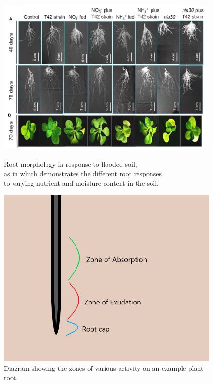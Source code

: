 \documentclass[11pt]{article}
\begin{document}

\begin{figure}
\centering
\begin{minipage}{.5\textwidth}
    \centering
    \includegraphics[width=\linewidth,trim= 10 70 10 0,clip]{rootMorphology.jpg}
    \caption{Root morphology in response to flooded soil, \\ as in \cite{PURNOBASUKI20182012} which demonstrates the different root responses\\ to varying nutrient and moisture content in the soil.}
    \label{fig:roots}
\end{minipage}%
\begin{minipage}{.5\textwidth}
  \centering
    \includegraphics[width=.5\linewidth,trim=50 20 100 20,clip]{Zonesdiagram.png}
    \caption{Diagram showing the zones of various activity on an example plant root.}
    \label{fig:zones}
\end{minipage}
\end{figure}
\end{document}
